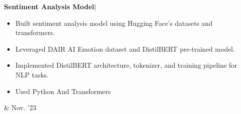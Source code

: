\documentclass[10pt, letterpaper]{article}
\newenvironment{highlights}{
        \begin{itemize}[
                topsep=0pt,
                parsep=0.10 cm,
                partopsep=0pt,
                itemsep=0pt,
                after=\vspace{-1\baselineskip},
                leftmargin=0.4 cm + 3pt
            ]
    }{
        \end{itemize}
    } %
\let\hrefWithoutArrow\href
\renewcommand{\href}[2]{\hrefWithoutArrow{#1}{\mbox{\ifthenelse{\equal{#2}{}}{ }{#2 }\raisebox{.15ex}{\footnotesize \faExternalLink*}}}}
\let\originalTabularx\tabularx
\let\originalEndTabularx\endtabularx
\renewenvironment{tabularx}{\bgroup\centering\originalTabularx}{\originalEndTabularx\par\egroup}
\begin{document}
  \begin{tabularx}{
            \textwidth-0.4 cm-0.13cm
        }{
            K{0.2 cm}
            R{4.1 cm}
        }
            \textbf 
            {Sentiment Analysis Model}$|$ \href{https://github.com/09hritik/sentiment-analysis}{\raisebox{-0.2\height}\faGithub\ }

            \vspace{0.10 cm}

            \begin{highlights}
                \item  
                   
            \begin{enumerate}
                Built sentiment analysis model using Hugging Face's datasets and transformers.

            \end{enumerate}

            \item 
                Leveraged DAIR AI Emotion dataset and DistilBERT pre-trained model.

            \item  
                Implemented DistilBERT architecture, tokenizer, and training pipeline for NLP tasks.
            \item 
                Used  Python And Transformers
               
            \end{highlights}
            &
            Nov.  '23
    \end{tabularx}


    




\end{document}
